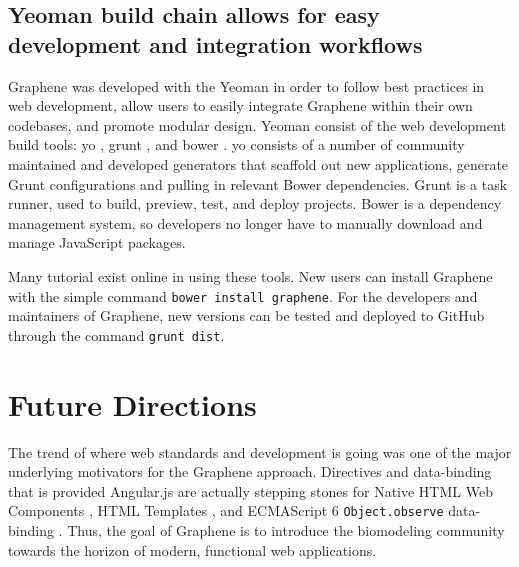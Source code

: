 \subsection{Yeoman build chain allows for easy development and integration workflows}

Graphene was developed with the Yeoman in order to follow best practices in web development, allow users to easily integrate Graphene within their own codebases, and promote modular design.
Yeoman consist of the web development build tools: yo \autocite{yeoman2014yo}, grunt \autocite{alman2014grunt}, and bower \autocite{twitter2014bower}.
yo consists of a number of community maintained and developed generators that scaffold out new applications, generate Grunt configurations and pulling in relevant Bower dependencies.
Grunt is a task runner, used to build, preview, test, and deploy projects.
Bower is a dependency management system, so developers no longer have to manually download and manage JavaScript packages.

Many tutorial exist online in using these tools.
New users can install Graphene with the simple command \texttt{bower install graphene}.
For the developers and maintainers of Graphene, new versions can be tested and deployed to GitHub through the command \texttt{grunt dist}.

\section{Future Directions}
The trend of where web standards and development is going was one of the major underlying motivators for the Graphene approach.
Directives and data-binding that is provided Angular.js are actually stepping stones for Native HTML Web Components \autocite{w3c2014components}, HTML Templates \autocite{w3c2014templating}, and ECMAScript 6 \texttt{Object.observe} data-binding \autocite{polymer2014templating}.
Thus, the goal of Graphene is to introduce the biomodeling community towards the horizon of modern, functional web applications.

